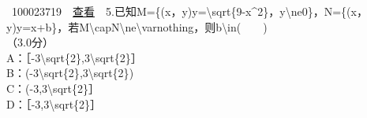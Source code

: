 \documentclass[]{article}
\begin{document}
~{{100023719}~~\href{../question/viewQuestionDetail.jsp?questionID=100023719\&testPaperId=100229072}{查看}~~5.已知M=\{(x，y)\textbar{}y={\textbackslash{}sqrt\{9-x\^{}2\}}，y{\textbackslash{}ne}0{\}}，N=\{(x，y)\textbar{}y=x+b\}，若M{\textbackslash{}cap}N{\textbackslash{}ne}{\textbackslash{}varnothing}，则b{\textbackslash{}in}(　　)\\
\hspace*{0.333em}\hspace*{0.333em}（3.0分）\\
\hspace*{0.333em}\hspace*{0.333em}\hspace*{0.333em}\hspace*{0.333em}\hspace*{0.333em}\hspace*{0.333em}\hspace*{0.333em}\hspace*{0.333em}A：［-3{\textbackslash{}sqrt\{2\}},3{\textbackslash{}sqrt\{2\}}］\\
\hspace*{0.333em}\hspace*{0.333em}\hspace*{0.333em}\hspace*{0.333em}\hspace*{0.333em}\hspace*{0.333em}\hspace*{0.333em}\hspace*{0.333em}B：(-3{\textbackslash{}sqrt\{2\}},3{\textbackslash{}sqrt\{2\}})\\[2\baselineskip]\hspace*{0.333em}\hspace*{0.333em}\hspace*{0.333em}\hspace*{0.333em}\hspace*{0.333em}\hspace*{0.333em}\hspace*{0.333em}\hspace*{0.333em}C：(-3,3{\textbackslash{}sqrt\{2\}}］\\
\hspace*{0.333em}\hspace*{0.333em}\hspace*{0.333em}\hspace*{0.333em}\hspace*{0.333em}\hspace*{0.333em}\hspace*{0.333em}\hspace*{0.333em}D：［-3,3{\textbackslash{}sqrt\{2\}}］\\
}
\end{document}
